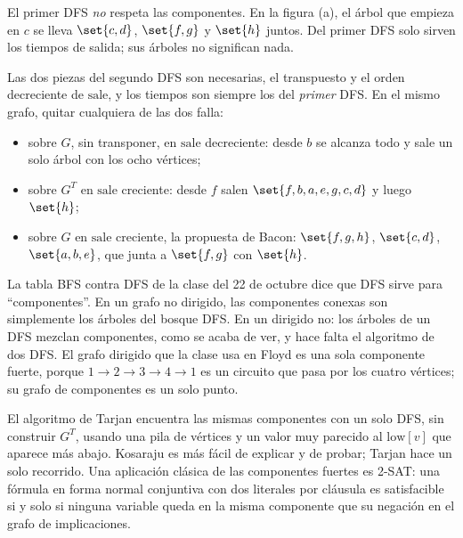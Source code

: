\documentclass[11pt,letterpaper]{article}
\begin{document}
\begin{ojo}
  El primer DFS \emph{no} respeta las componentes. En la figura (a), el
  árbol que empieza en $c$ se lleva $\set{c, d}$, $\set{f, g}$ y
  $\set{h}$ juntos. Del primer DFS solo sirven los tiempos de salida;
  sus árboles no significan nada.

  Las dos piezas del segundo DFS son necesarias, el transpuesto y el
  orden decreciente de $\text{sale}$, y los tiempos son siempre los del
  \emph{primer} DFS. En el mismo grafo, quitar cualquiera de las dos
  falla:
  \begin{itemize}[itemsep=0.1em]
    \item sobre $G$, sin transponer, en $\text{sale}$ decreciente: desde
          $b$ se alcanza todo y sale un solo árbol con los ocho
          vértices;
    \item sobre $G^T$ en $\text{sale}$ creciente: desde $f$ salen
          $\set{f, b, a, e, g, c, d}$ y luego $\set{h}$;
    \item sobre $G$ en $\text{sale}$ creciente, la propuesta de Bacon:
          $\set{f, g, h}$, $\set{c, d}$, $\set{a, b, e}$, que junta a
          $\set{f, g}$ con $\set{h}$.
  \end{itemize}
\end{ojo}

\begin{observacion}
  La tabla BFS contra DFS de la clase del 22 de octubre dice que DFS
  sirve para ``componentes''. En un grafo no dirigido, las componentes
  conexas son simplemente los árboles del bosque DFS. En un dirigido
  no: los árboles de un DFS mezclan componentes, como se acaba de ver,
  y hace falta el algoritmo de dos DFS. El grafo dirigido que la clase
  usa en Floyd es una sola componente fuerte, porque
  $1 \to 2 \to 3 \to 4 \to 1$ es un circuito que pasa por los cuatro
  vértices; su grafo de componentes es un solo punto.
\end{observacion}

\begin{observacion}
  El algoritmo de Tarjan encuentra las mismas componentes con un solo
  DFS, sin construir $G^T$, usando una pila de vértices y un valor muy
  parecido al $\text{low}[v]$ que aparece más abajo. Kosaraju es más
  fácil de explicar y de probar; Tarjan hace un solo recorrido. Una
  aplicación clásica de las componentes fuertes es 2-SAT: una fórmula
  en forma normal conjuntiva con dos literales por cláusula es
  satisfacible si y solo si ninguna variable queda en la misma
  componente que su negación en el grafo de implicaciones.
\end{observacion}
\end{document}
